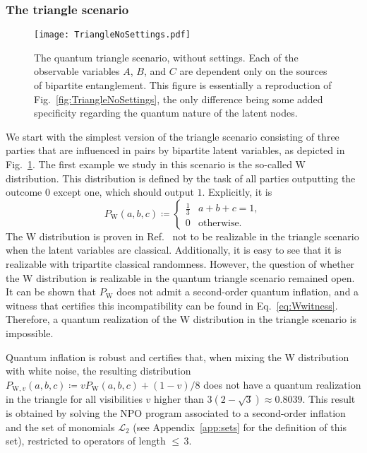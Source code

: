 \documentclass[superscriptaddress,aps,prx,nofootinbib,twocolumn,twoside,reprint,letterpaper,longbibliography]{revtex4-2}
\begin{document}
\subsubsection{The triangle scenario}
\label{sec:SimpleTriangle}
\begin{figure}[t]
  \centering
  \texttt{[image: TriangleNoSettings.pdf]}
  \caption{The quantum triangle scenario, without settings. Each of the observable variables $A$, $B$, and $C$ are dependent only on the sources of bipartite entanglement. This figure is essentially a reproduction of Fig.~\ref{fig:TriangleNoSettings}, the only difference being some added specificity regarding the quantum nature of the latent nodes.}
  \label{fig:TriangleNoSettingsQ}
\end{figure}
We start with the simplest version of the triangle scenario consisting of three parties that are influenced in pairs by bipartite latent variables, as depicted in Fig.~\ref{fig:TriangleNoSettingsQ}.
The first example we study in this scenario is the so-called W distribution.
This distribution is defined by the task of all parties outputting the outcome $0$ except one, which should output $1$.
Explicitly, it is
\begin{equation}
    P_\text{W}(a,b,c)\coloneqq\begin{cases}
        \frac{1}{3} & a+b+c=1, \\
        0           & \text{otherwise.}
    \end{cases}
    \label{wdistribution}
\end{equation}
The W distribution is proven in Ref.~\cite{wolfe2016inflation} not to be realizable in the triangle scenario when the latent variables are classical.
Additionally, it is easy to see that it is realizable with tripartite classical randomness.
However, the question of whether the W distribution is realizable in the quantum triangle scenario remained open.
It can be shown that $P_\text{W}$ does not admit a second-order quantum inflation, and a witness that certifies this incompatibility can be found in Eq.~\eqref{eq:Wwitness}.
Therefore, a quantum realization of the W distribution in the triangle scenario is impossible.

Quantum inflation is robust and certifies that, when mixing the W distribution with white noise, the resulting distribution $P_{\text{W},v}(a,b,c)\coloneqq v P_\text{W}(a,b,c)+(1-v)/8$ does not have a quantum realization in the triangle for all visibilities $v$ higher than $3(2-\sqrt{3})\approx0.8039$. This result is obtained by solving the NPO program associated to a second-order inflation and the set of monomials $\mathcal{L}_2$ (see Appendix~\ref{app:sets} for the definition of this set), restricted to operators of length ${\leq}\,3$.
\end{document}
